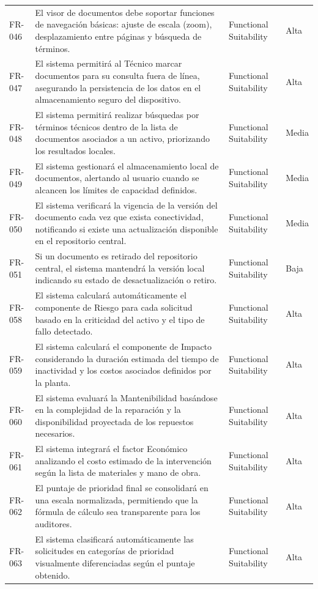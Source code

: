 \begin{longtable}{>{\raggedright\arraybackslash}p{} >{\raggedright\arraybackslash}p{} >{\raggedright\arraybackslash}p{} >{\raggedright\arraybackslash}p{}}
FR-046 & El visor de documentos debe soportar funciones de navegación básicas: ajuste de escala (zoom), desplazamiento entre páginas y búsqueda de términos. & Functional Suitability & Alta \\
FR-047 & El sistema permitirá al Técnico marcar documentos para su consulta fuera de línea, asegurando la persistencia de los datos en el almacenamiento seguro del dispositivo. & Functional Suitability & Alta \\
FR-048 & El sistema permitirá realizar búsquedas por términos técnicos dentro de la lista de documentos asociados a un activo, priorizando los resultados locales. & Functional Suitability & Media \\
FR-049 & El sistema gestionará el almacenamiento local de documentos, alertando al usuario cuando se alcancen los límites de capacidad definidos. & Functional Suitability & Media \\
FR-050 & El sistema verificará la vigencia de la versión del documento cada vez que exista conectividad, notificando si existe una actualización disponible en el repositorio central. & Functional Suitability & Media \\
FR-051 & Si un documento es retirado del repositorio central, el sistema mantendrá la versión local indicando su estado de desactualización o retiro. & Functional Suitability & Baja \\
FR-058 & El sistema calculará automáticamente el componente de Riesgo para cada solicitud basado en la criticidad del activo y el tipo de fallo detectado. & Functional Suitability & Alta \\
FR-059 & El sistema calculará el componente de Impacto considerando la duración estimada del tiempo de inactividad y los costos asociados definidos por la planta. & Functional Suitability & Alta \\
FR-060 & El sistema evaluará la Mantenibilidad basándose en la complejidad de la reparación y la disponibilidad proyectada de los repuestos necesarios. & Functional Suitability & Alta \\
FR-061 & El sistema integrará el factor Económico analizando el costo estimado de la intervención según la lista de materiales y mano de obra. & Functional Suitability & Alta \\
FR-062 & El puntaje de prioridad final se consolidará en una escala normalizada, permitiendo que la fórmula de cálculo sea transparente para los auditores. & Functional Suitability & Alta \\
FR-063 & El sistema clasificará automáticamente las solicitudes en categorías de prioridad visualmente diferenciadas según el puntaje obtenido. & Functional Suitability & Alta \\

\end{longtable}
